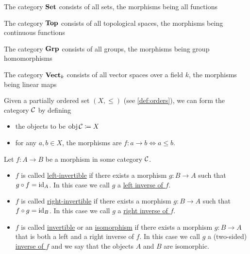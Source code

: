 \begin{definition}\label{def:standard_categories}
  \begin{defenum}
    \item\label{def:standard_categories/set} The category $\operatorname{\mathbf{Set}}$ consists of all sets, the morphisms being all functions
    \item\label{def:standard_categories/top} The category $\operatorname{\mathbf{Top}}$ consists of all topological spaces, the morphisms being continuous functions
    \item\label{def:standard_categories/grp} The category $\operatorname{\mathbf{Grp}}$ consists of all groups, the morphisms being group homomorphisms
    \item\label{def:standard_categories/vect} The category $\operatorname{\mathbf{Vect}}_k$ consists of all vector spaces over a field $k$, the morphisms being linear maps
    \item\label{def:standard_categories/ord} Given a partially ordered set $(X, \leq)$ (see \cref{def:orders}), we can form the category $\mathcal C$ by defining
    \begin{itemize}
      \item the objects to be $\operatorname{obj} \mathcal C \coloneqq X$
      \item for any $a, b \in X$, the morphisms are $f: a \to b \iff a \leq b$.
    \end{itemize}
  \end{defenum}
\end{definition}

\begin{definition}\label{def:morphism_invertability}
  Let $f: A \to B$ be a morphism in some category $\mathcal C$.

  \begin{itemize}
    \item $f$ is called \uline{left-invertible} if there exists a morphism $g: B \to A$ such that $g \circ f = \operatorname{id}_A$. In this case we call $g$ a \uline{left inverse of $f$}.

    \item $f$ is called \uline{right-invertible} if there exists a morphism $g: B \to A$ such that $f \circ g = \operatorname{id}_B$. In this case we call $g$ a \uline{right inverse of $f$}.

    \item $f$ is called \uline{invertible} or an \uline{isomorphism} if there exists a morphism $g: B \to A$ that is both a left and a right inverse of $f$. In this case we call $g$ a (two-sided) \uline{inverse of $f$} and we say that the objects $A$ and $B$ are isomorphic.
  \end{itemize}
\end{definition}

